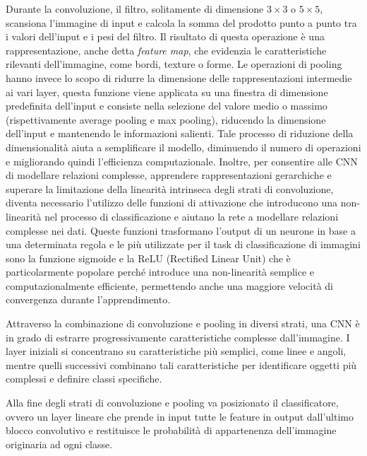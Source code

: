 Durante la convoluzione, il filtro, solitamente di dimensione $3\times3$ o $5\times5$, scansiona l'immagine di input e calcola la somma del prodotto punto a punto tra i valori dell'input e i pesi del filtro. Il risultato di questa operazione è una rappresentazione, anche detta \textit{feature map}, che evidenzia le caratteristiche rilevanti dell'immagine, come bordi, texture o forme. Le operazioni di pooling hanno invece lo scopo di ridurre la dimensione delle rappresentazioni intermedie ai vari layer, questa funzione viene applicata su una finestra di dimensione predefinita dell'input e consiste nella selezione del valore medio o massimo (rispettivamente average pooling e  max pooling), riducendo la dimensione dell'input e mantenendo le informazioni salienti. Tale processo di riduzione della dimensionalità aiuta a semplificare il modello, diminuendo il numero di operazioni e migliorando quindi l'efficienza computazionale. Inoltre, per consentire alle CNN di modellare relazioni complesse, apprendere rappresentazioni gerarchiche e superare la limitazione della linearità intrinseca degli strati di convoluzione, diventa necessario l'utilizzo delle funzioni di attivazione che introducono una non-linearità nel processo di classificazione e aiutano la rete a modellare relazioni complesse nei dati. Queste funzioni trasformano l'output di un neurone in base a una determinata regola e le più utilizzate per il task di classificazione di immagini sono la funzione sigmoide e la ReLU (Rectified Linear Unit) che è particolarmente popolare perché introduce una non-linearità semplice e computazionalmente efficiente, permettendo anche una maggiore velocità di convergenza durante l'apprendimento.

\iffalse
\begin{figure}[ht!]
    \centering
    \psfig{file=immagini/cnn.png,width=0.9\textwidth}
    \caption{\textit{Convolutional Neural Network per la classificazione di immagini}.}
    \label{fig:cnn}
\end{figure}
\fi

Attraverso la combinazione di convoluzione e pooling in diversi strati, una CNN è in grado di estrarre progressivamente caratteristiche complesse dall'immagine. I layer iniziali si concentrano su caratteristiche più semplici, come linee e angoli, mentre quelli successivi combinano tali caratteristiche per identificare oggetti più complessi e definire classi specifiche. 
\cite{10.1093}

Alla fine degli strati di convoluzione e pooling va posizionato il classificatore, ovvero un layer lineare che prende in input tutte le feature in output dall'ultimo blocco convolutivo e restituisce le probabilità di appartenenza dell'immagine originaria ad ogni classe. \\

